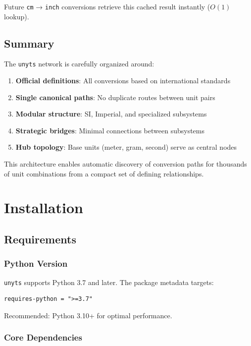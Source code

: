 \documentclass[11pt,a4paper]{report}
\begin{document}
Future \texttt{cm} → \texttt{inch} conversions retrieve this cached result instantly ($O(1)$ lookup).

\section{Summary}

The \texttt{unyts} network is carefully organized around:
\begin{enumerate}[leftmargin=*]
  \item \textbf{Official definitions}: All conversions based on international standards
  \item \textbf{Single canonical paths}: No duplicate routes between unit pairs
  \item \textbf{Modular structure}: SI, Imperial, and specialized subsystems
  \item \textbf{Strategic bridges}: Minimal connections between subsystems
  \item \textbf{Hub topology}: Base units (meter, gram, second) serve as central nodes
\end{enumerate}

This architecture enables automatic discovery of conversion paths for thousands of unit combinations from a compact set of defining relationships.


\chapter{Installation}

\section{Requirements}

\subsection{Python Version}
\texttt{unyts} supports Python 3.7 and later. The package metadata targets:
\begin{lstlisting}[style=bashstyle]
requires-python = ">=3.7"
\end{lstlisting}

Recommended: Python 3.10+ for optimal performance.

\subsection{Core Dependencies}
\end{document}
